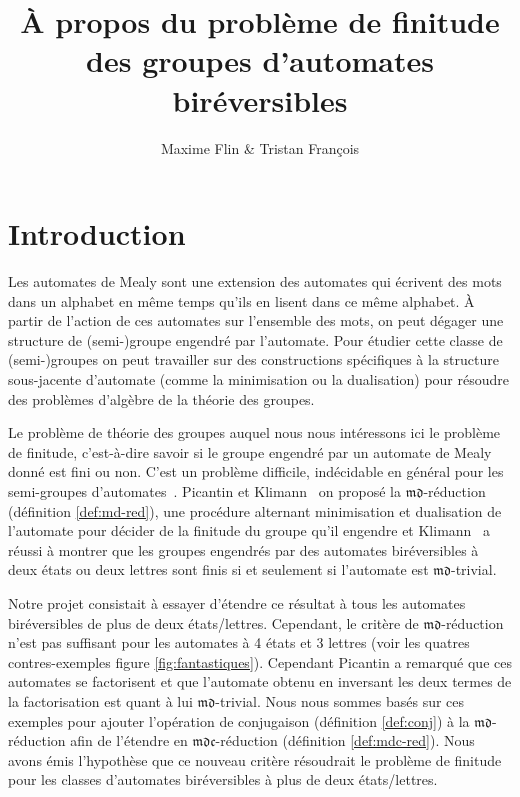 \documentclass[11pt,a4paper]{article}
\title{À propos du problème de finitude des groupes d'automates biréversibles}
\author{Maxime Flin \& Tristan François}
\begin{document}
\maketitle

\section*{Introduction}
Les automates de Mealy sont une extension des automates qui écrivent des mots dans un alphabet en même temps qu'ils en lisent dans ce même alphabet. À partir de l'action de ces automates sur l'ensemble des mots, on peut dégager une structure de (semi-)groupe engendré par l'automate. Pour étudier cette classe de (semi-)groupes on peut travailler sur des constructions spécifiques à la structure sous-jacente d'automate (comme la minimisation ou la dualisation) pour résoudre des problèmes d'algèbre de la théorie des groupes.

Le problème de théorie des groupes auquel nous nous intéressons ici le problème de finitude, c’est-à-dire savoir si le groupe engendré par un automate de Mealy donné est fini ou non. C'est un problème difficile, indécidable en général pour les semi-groupes d'automates~\cite{Undecidable}. Picantin et Klimann~\cite{DBLP:journals/corr/abs-1105-4725} on proposé la $\mathfrak{md}$-réduction (définition \ref{def:md-red}), une procédure alternant minimisation et dualisation de l'automate pour décider de la finitude du groupe qu'il engendre et Klimann~\cite{Klimann13} a réussi à montrer que les groupes engendrés par des automates biréversibles à deux états ou deux lettres sont finis si et seulement si l'automate est $\mathfrak{md}$-trivial.

Notre projet consistait à essayer d'étendre ce résultat à tous les automates biréversibles de plus de deux états/lettres. Cependant,  le critère de $\mathfrak{md}$-réduction n'est pas suffisant pour les automates à 4 états et 3 lettres (voir les quatres contres-exemples figure \ref{fig:fantastiques}). Cependant Picantin a remarqué que ces automates se factorisent et que l'automate obtenu en inversant les deux termes de la factorisation est quant à lui $\mathfrak{md}$-trivial. Nous nous sommes basés sur ces exemples pour ajouter l'opération de conjugaison (définition \ref{def:conj}) à la $\mathfrak{md}$-réduction afin de l'étendre en $\mathfrak{mdc}$-réduction (définition \ref{def:mdc-red}). Nous avons émis l'hypothèse que ce nouveau critère résoudrait le problème de finitude pour les classes d'automates biréversibles à plus de deux états/lettres.
\end{document}
